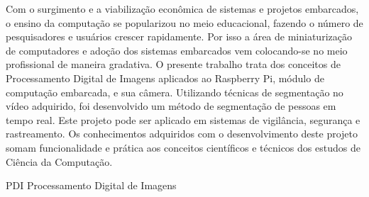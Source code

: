 \documentclass[12pt,oneside,a4paper,chapter=TITLE,section=TITLE,sumario=tradicional]{abntex2}
\begin{document}

\imprimircapa
\imprimirfolhaderosto

\begin{resumo}
Com o surgimento e a viabilização econômica de sistemas e projetos embarcados, o ensino da computação se popularizou no meio educacional, fazendo o número de pesquisadores e usuários crescer rapidamente. Por isso a área de miniaturização de computadores e adoção dos sistemas embarcados vem colocando-se no meio profissional de maneira gradativa. O presente trabalho trata dos conceitos de Processamento Digital de Imagens aplicados ao Raspberry Pi, módulo de computação embarcada, e sua câmera. Utilizando técnicas de segmentação no vídeo adquirido, foi desenvolvido um método de segmentação de pessoas em tempo real.  Este projeto pode ser aplicado em sistemas de vigilância, segurança e rastreamento. Os conhecimentos adquiridos com o desenvolvimento deste projeto somam funcionalidade e prática aos conceitos científicos e técnicos dos estudos de Ciência da Computação.

\end{resumo}

\listadefiguras
\listadequadros

\begin{siglas}
  \item[PDI] Processamento Digital de Imagens
\end{siglas}



\sumario

\textual
\end{document}
